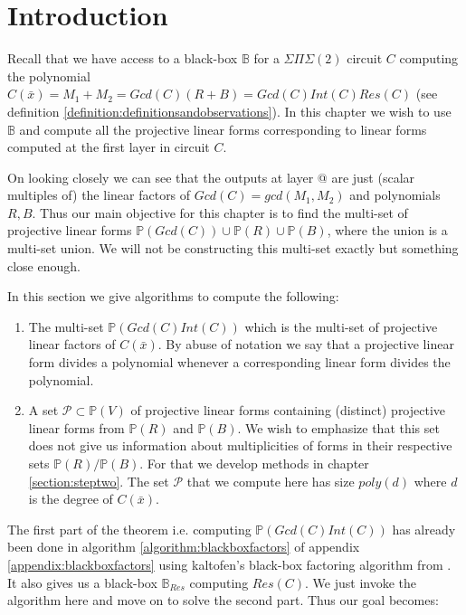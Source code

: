 \documentclass[12pt]{caltech_thesis}
\makeatletter
\theoremstyle{plain}
\theoremstyle{definition}
\newcommand{\MP}{\mathcal{P}}
\newcommand{\CB}{\mathbb{B}}
\newcommand{\PP}{\mathbb{P}}
\newcommand{\B}[1]{\bar{#1}}
\newcommand*{\rom}[1]{\expandafter\@slowromancap\romannumeral #1@}
\makeatother
\begin{document}
\section{Introduction}


Recall that we have access to a black-box $\CB$ for a $\Sigma\Pi\Sigma(2)$ circuit $C$ computing the polynomial 
$C(\B{x}) = M_1 + M_2 = Gcd(C) (R+B) = Gcd(C)Int(C)Res(C)$ (see definition \ref{definition:definitionsandobservations}). 
In this chapter we wish to use $\CB$ and compute all the
  projective linear forms corresponding to linear forms computed at the first layer in circuit $C$. 

On looking closely we can see that the outputs at layer \rom{1} are just (scalar multiples of) the linear factors of $Gcd(C) = gcd(M_1,M_2)$ and polynomials
$R, B$. 
Thus our main objective for this chapter is to find the multi-set of projective linear forms 
$\PP(Gcd(C))\cup\PP(R)\cup \PP(B)$, where the union is a multi-set union. We will not be constructing this multi-set exactly but something 
close enough.

In this section we give algorithms to compute the following:
\begin{enumerate}
\item The multi-set $\PP(Gcd(C)Int(C))$ which is the multi-set of  projective linear factors of 
$C(\B{x})$. By abuse of notation we say that a projective linear form divides a polynomial whenever a corresponding 
linear form divides the polynomial. 

\item A set $\MP\subset \PP(V)$ of   projective linear forms containing (distinct) projective linear forms from 
$\PP(R)$ and $\PP(B)$. We wish to emphasize that this set does not give us information about multiplicities
of forms in their respective sets $\PP(R)/\PP(B)$. For that we develop methods in chapter \ref{section:steptwo}. 
The set $\MP$ that we compute here has size $poly(d)$ where $d$ is the degree of $C(\B{x})$.
\end{enumerate}






The first part of the theorem i.e. computing $\PP(Gcd(C)Int(C))$ has already been done in algorithm \ref{algorithm:blackboxfactors} of 
appendix \ref{appendix:blackboxfactors} using kaltofen's black-box factoring algorithm from \cite{KalTr90}. It also gives
us a black-box $\CB_{Res}$ computing $Res(C)$. We just invoke the algorithm here and move on to solve the second part. Thus our goal becomes:
\end{document}
